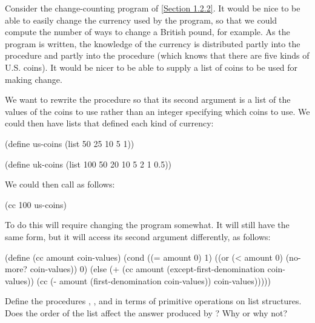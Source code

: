\begin{exercise}
	\label{Exercise 2.19}
	Consider the change-counting program of \cref{Section 1.2.2}.
	It would be nice to be able to easily change the currency used by the program, so that we could compute the number of ways to change a British pound, for example.
	As the program is written, the knowledge of the currency is distributed partly into the procedure  and partly into the procedure  (which knows that there are five kinds of U.S. coins).
	It would be nicer to be able to supply a list of coins to be used for making change.

	We want to rewrite the procedure  so that its second argument is a list of the values of the coins to use rather than an integer specifying which coins to use.
	We could then have lists that defined each kind of currency:
	\begin{scheme}
	  (define us-coins (list 50 25 10 5 1))

	  (define uk-coins (list 100 50 20 10 5 2 1 0.5))
	\end{scheme}
	We could then call  as follows:
	\begin{scheme}
	  (cc 100 us-coins)
	  ~~
	\end{scheme}
	To do this will require changing the program  somewhat.
	It will still have the same form, but it will access its second argument differently, as follows:
	\begin{scheme}
	  (define (cc amount coin-values)
	    (cond ((= amount 0) 1)
	          ((or (< amount 0) (no-more? coin-values)) 0)
	          (else
	           (+ (cc amount
	                  (except-first-denomination coin-values))
	              (cc (- amount
	                     (first-denomination coin-values))
	                  coin-values)))))
	\end{scheme}
	Define the procedures , , and  in terms of primitive operations on list structures.
	Does the order of the list  affect the answer produced by ?
	Why or why not?
\end{exercise}



